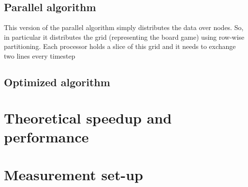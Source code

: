 \documentclass{article}
\begin{document}
\subsection{Parallel algorithm}
This version of the parallel algorithm simply distributes the data over nodes.
So, in particular it distributes the grid (representing the board game) using
row-wise partitioning.
Each processor holds a slice of this grid and it needs to exchange two lines
every timestep

\subsection{Optimized algorithm}


\section{Theoretical speedup and performance}

\section{Measurement set-up}

\section{}
\end{document}
